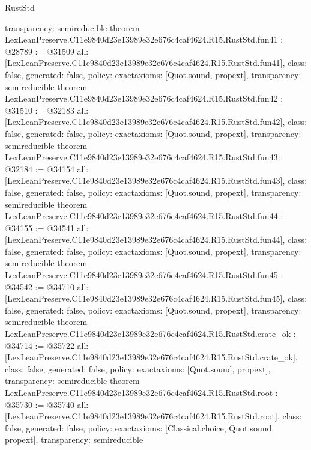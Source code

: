 \begin{lexlean}{RustStd}
\begin{coremodule}
{  transparency: semireducible
}
theorem LexLeanPreserve.C11e9840d23e13989e32e676c4caf4624.R15.RustStd.fun41 : @28789 := @31509 {
  all: [LexLeanPreserve.C11e9840d23e13989e32e676c4caf4624.R15.RustStd.fun41],
  class: false,
  generated: false,
  policy: exact{axioms: [Quot.sound, propext]},
  transparency: semireducible
}
theorem LexLeanPreserve.C11e9840d23e13989e32e676c4caf4624.R15.RustStd.fun42 : @31510 := @32183 {
  all: [LexLeanPreserve.C11e9840d23e13989e32e676c4caf4624.R15.RustStd.fun42],
  class: false,
  generated: false,
  policy: exact{axioms: [Quot.sound, propext]},
  transparency: semireducible
}
theorem LexLeanPreserve.C11e9840d23e13989e32e676c4caf4624.R15.RustStd.fun43 : @32184 := @34154 {
  all: [LexLeanPreserve.C11e9840d23e13989e32e676c4caf4624.R15.RustStd.fun43],
  class: false,
  generated: false,
  policy: exact{axioms: [Quot.sound, propext]},
  transparency: semireducible
}
theorem LexLeanPreserve.C11e9840d23e13989e32e676c4caf4624.R15.RustStd.fun44 : @34155 := @34541 {
  all: [LexLeanPreserve.C11e9840d23e13989e32e676c4caf4624.R15.RustStd.fun44],
  class: false,
  generated: false,
  policy: exact{axioms: [Quot.sound, propext]},
  transparency: semireducible
}
theorem LexLeanPreserve.C11e9840d23e13989e32e676c4caf4624.R15.RustStd.fun45 : @34542 := @34710 {
  all: [LexLeanPreserve.C11e9840d23e13989e32e676c4caf4624.R15.RustStd.fun45],
  class: false,
  generated: false,
  policy: exact{axioms: [Quot.sound, propext]},
  transparency: semireducible
}
theorem LexLeanPreserve.C11e9840d23e13989e32e676c4caf4624.R15.RustStd.crate_ok : @34714 := @35722 {
  all: [LexLeanPreserve.C11e9840d23e13989e32e676c4caf4624.R15.RustStd.crate_ok],
  class: false,
  generated: false,
  policy: exact{axioms: [Quot.sound, propext]},
  transparency: semireducible
}
theorem LexLeanPreserve.C11e9840d23e13989e32e676c4caf4624.R15.RustStd.root : @35730 := @35740 {
  all: [LexLeanPreserve.C11e9840d23e13989e32e676c4caf4624.R15.RustStd.root],
  class: false,
  generated: false,
  policy: exact{axioms: [Classical.choice, Quot.sound, propext]},
  transparency: semireducible
}


\end{coremodule}
\end{lexlean}
